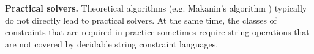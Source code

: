 \smallskip
\noindent
\textbf{Practical solvers.}
%
%
%
%
% 
Theoretical algorithms  (e.g. Makanin's algorithm \cite{Makanin}) typically do not directly lead to  practical solvers. At the same time, the classes of constraints that are required in practice sometimes require string operations that are not covered by decidable string constraint languages.
